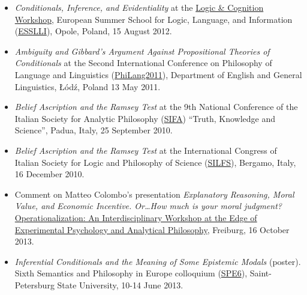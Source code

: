 \documentclass[a4paper,12pt]{article}
\begin{document}
\begin{small}
\begin{itemize}
  \item \emph{Conditionals, Inference, and Evidentiality} at the
    \href{http://www.ai.rug.nl/SocialCognition/logic-cognition/}{Logic
      \& Cognition Workshop}, European Summer School for Logic,
    Language, and Information
    (\href{http://www.esslli2012.pl}{ESSLLI}), Opole, Poland, 15 August
    2012. %

  \item \emph{Ambiguity and Gibbard's Argument Against Propositional
      Theories of Conditionals} at the Second International Conference
    on Philosophy of Language and Linguistics
    (\href{http://ia.uni.lodz.pl/linguistics/events/philang-2011}{PhiLang2011}),
    Department of English and General Linguistics, Łódź, Poland
    13 May
    2011. %

  \item \emph{Belief Ascription and the Ramsey Test} at the 9th
    National Conference of the Italian Society for Analytic Philosophy
    (\href{http://www.filosofia.lettere.unipd.it/analitica/sifa2010/}{SIFA})
    ``Truth, Knowledge and Science'', Padua, Italy, 25 September
    2010. %

    
  \item \emph{Belief Ascription and the Ramsey Test} at the
    International Congress of Italian Society for Logic and Philosophy
    of Science
    (\href{http://dinamico2.unibg.it/silfs/convegno2010.htm}{SILFS}),
    Bergamo, Italy, 16 December
    2010. %
  \end{itemize}
  

  \begin{itemize}

\item Comment on Matteo Colombo's presentation \emph{Explanatory Reasoning, Moral Value, and Economic Incentive. Or\ldots How much is your moral judgment?} 
    \href{http://www.psychologie.uni-freiburg.de/Members/singmann/operational2013}{Operationalization: An Interdisciplinary Workshop at the Edge of Experimental Psychology and Analytical Philosophy}, Freiburg, 16 October 2013.

  \item \emph{Inferential Conditionals and the Meaning of Some
      Epistemic Modals} (poster). Sixth Semantics and Philosophy
    in Europe colloquium
    (\href{http://spe6conference.wordpress.com}{SPE6}),
    Saint-Petersburg State University, 10-14 June 2013.
    

\end{itemize}
\end{small}
\end{document}
